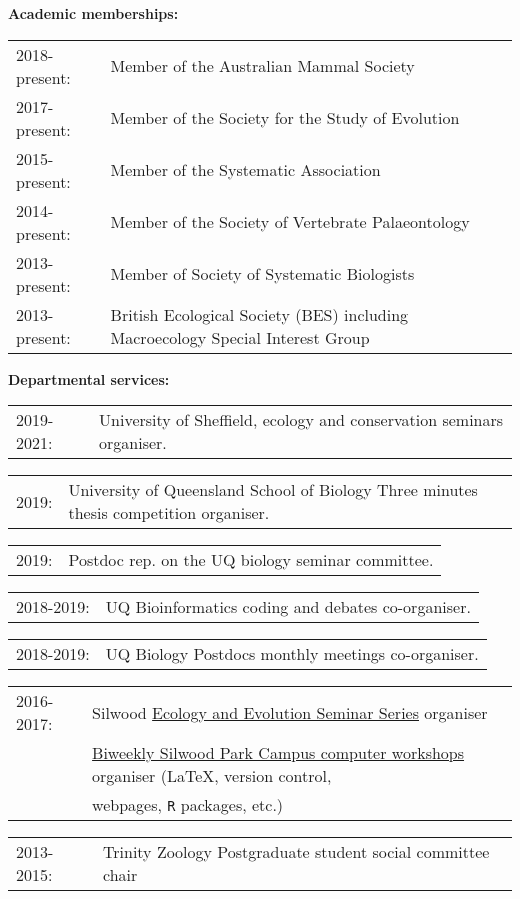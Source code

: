 \documentclass[10pt,a4paper]{article}
\begin{document}
{\bigskip

\raggedright\textbf{Academic memberships:}
\begin{tabular}{ll}
2018-present: & Member of the Australian Mammal Society\\ 
2017-present: & Member of the Society for the Study of Evolution\\ 
2015-present: & Member of the Systematic Association\\ 
2014-present: & Member of the Society of Vertebrate Palaeontology\\
2013-present: & Member of Society of Systematic Biologists\\
2013-present: & British Ecological Society (BES) including Macroecology Special Interest Group\\
\end{tabular}
\bigskip

\raggedright\textbf{Departmental services:}

\begin{tabular}{ll}
2019-2021: & University of Sheffield, ecology and conservation seminars organiser.\\
\end{tabular}
\begin{tabular}{ll}
2019: & University of Queensland School of Biology Three minutes thesis competition organiser.\\
\end{tabular}
\begin{tabular}{ll}
2019: & Postdoc rep. on the UQ biology seminar committee.\\
\end{tabular}
\begin{tabular}{ll}
2018-2019: & UQ Bioinformatics coding and debates co-organiser.\\
\end{tabular}
\begin{tabular}{ll}
2018-2019: & UQ Biology Postdocs monthly meetings co-organiser.\\
\end{tabular}
\begin{tabular}{ll}
2016-2017: & Silwood \href{http://www.imperial.ac.uk/silwood-park/research/thursday-seminars/}{Ecology and Evolution Seminar Series} organiser\\
    & \href{https://silwoodcomputerskillz.github.io/}{Biweekly Silwood Park Campus computer workshops} organiser (\LaTeX, version control,\\
    & webpages, \texttt{R} packages, etc.) \\
\end{tabular}
\begin{tabular}{ll}
2013-2015: & Trinity Zoology Postgraduate student social committee chair \\
\end{tabular}
\bigskip

}
\end{document}
